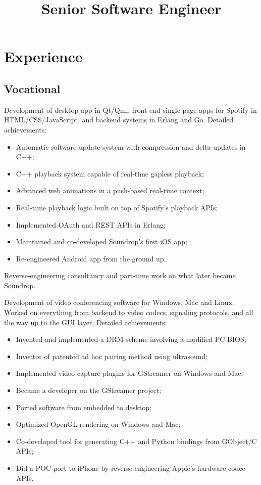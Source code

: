 \documentclass[11pt,a4paper,sans]{moderncv}
\title{Senior Software Engineer}
\begin{document}
\makecvtitle

\section{Experience}
\subsection{Vocational}
{Development of desktop app in Qt/Qml, front-end single-page apps for Spotify
in HTML/CSS/JavaScript, and backend systems in Erlang and Go.
\newline{}
Detailed achievements:
\begin{itemize}
\item Automatic software update system with compression and delta-updates in C++;
\item C++ playback system capable of real-time gapless playback;
\item Advanced web animations in a push-based real-time context;
\item Real-time playback logic built on top of Spotify's playback APIs;
\item Implemented OAuth and REST APIs in Erlang;
\item Maintained and co-developed Soundrop's first iOS app;
\item Re-engineered Android app from the ground up.
\end{itemize}}
{Reverse-engineering consultancy and part-time work on what later became Soundrop.}
{Development of video conferencing software for Windows, Mac and Linux.
Worked on everything from backend to video codecs, signaling protocols, and all
the way up to the GUI layer.\newline{}
Detailed achievements:
\begin{itemize}
\item Invented and implemented a DRM-scheme involving a modified PC BIOS;
\item Inventor of patented ad hoc pairing method using ultrasound;
\item Implemented video capture plugins for GStreamer on Windows and Mac;
\item Became a developer on the GStreamer project;
\item Ported software from embedded to desktop;
\item Optimized OpenGL rendering on Windows and Mac;
\item Co-developed tool for generating C++ and Python bindings from GObject/C APIs;
\item Did a POC port to iPhone by reverse-engineering Apple's hardware codec APIs.
\end{itemize}}
\end{document}
